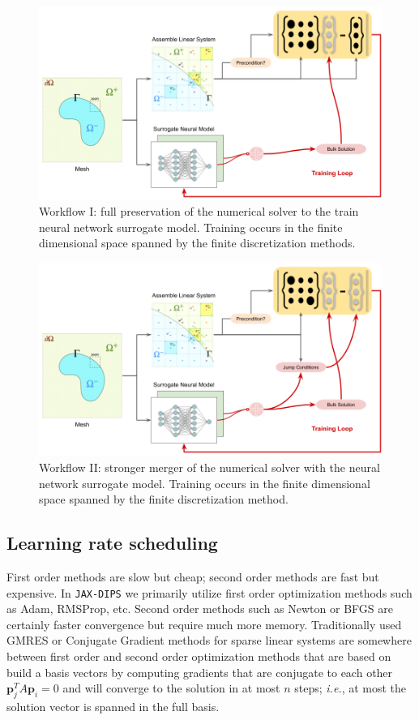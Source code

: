 \documentclass{elsarticle}
\begin{document}
\begin{figure}[ht]
	\centering
	\includegraphics[width=0.85\linewidth]{./figures/jax_dips_paper_v1.png}
	\caption{Workflow I: full preservation of the numerical solver to the train neural network surrogate model. Training occurs in the finite dimensional space spanned by the finite discretization methods.}
	\label{fig:proposal}
\end{figure}
\begin{figure}[ht]
	\centering
	\includegraphics[width=0.85\linewidth]{./figures/jax_dips_paper_v2.png}
	\caption{Workflow II: stronger merger of the numerical solver with the neural network surrogate model. Training occurs in the finite dimensional space spanned by the finite discretization method.}
	\label{fig:proposal}
\end{figure}




\subsection{Learning rate scheduling}
First order methods are slow but cheap; second order methods are fast but expensive. In \texttt{JAX-DIPS} we primarily utilize first order optimization methods such as Adam, RMSProp, etc. Second order methods such as Newton or BFGS are certainly faster convergence but require much more memory. Traditionally used GMRES or Conjugate Gradient methods for sparse linear systems are somewhere between first order and second order optimization methods that are based on build a basis vectors by computing gradients that are conjugate to each other $\mathbf{p}_j^T A \mathbf{p}_i=0$ and will converge to the solution in at most $n$ steps; \textit{i.e.}, at most the solution vector is spanned in the full basis.
\end{document}
